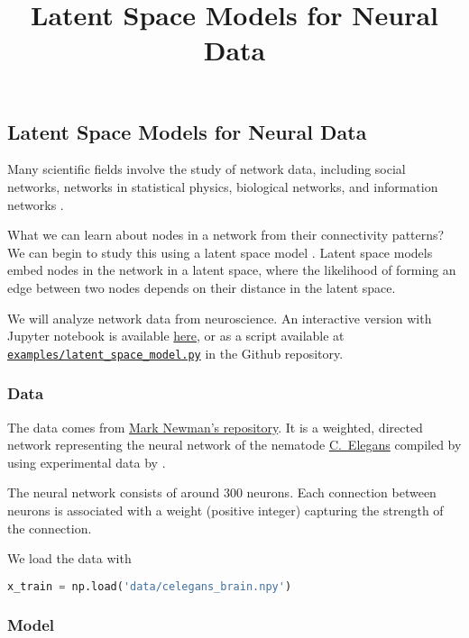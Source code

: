 \title{Latent Space Models for Neural Data}

\subsection{Latent Space Models for Neural Data}

Many scientific fields involve the study of network data, including
social networks, networks in statistical physics, biological
networks, and information networks
\citep{newman2010networks,goldenberg2010survey}.

What we can learn about nodes in a network from their connectivity patterns?
We can begin to study this using a latent space model \citep{hoff2002latent}.
Latent space models embed nodes in the network in a latent space,
where the likelihood of forming an edge between two nodes depends on
their distance in the latent space.

We will analyze network data from neuroscience.
An interactive version with Jupyter notebook is available
\href{http://nbviewer.jupyter.org/github/blei-lab/edward/blob/master/docs/notebooks/latent_space_models.ipynb}{here},
or as a script available at
\href{https://github.com/blei-lab/edward/blob/master/examples/latent_space_model.py}
{\texttt{examples/latent_space_model.py}} in the Github repository.

\subsubsection{Data}

The data comes from \href{http://www-personal.umich.edu/~mejn/netdata/}{Mark Newman's repository}.
It is a weighted, directed network representing the neural network of
the nematode
\href{https://en.wikipedia.org/wiki/Caenorhabditis_elegans}{C.~Elegans}
compiled by \citet{watts1998collective} using experimental data
by \citet{white1986structure}.

The neural network consists of around $300$ neurons. Each connection
between neurons
is associated with a weight (positive integer) capturing the strength
of the connection.

We load the data with
\begin{lstlisting}[language=Python]
x_train = np.load('data/celegans_brain.npy')
\end{lstlisting}

\subsubsection{Model}

